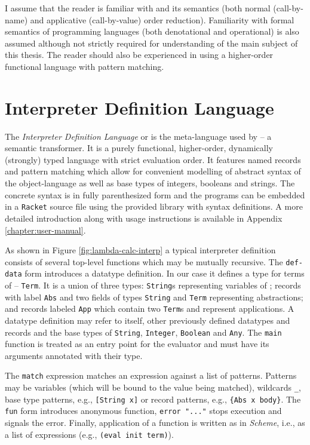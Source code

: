 I assume that the reader is familiar with \LC{} and its semantics (both normal (call-by-name) and applicative (call-by-value) order reduction).
Familiarity with formal semantics of programming languages (both denotational and operational) is also assumed although not strictly required for understanding of the main subject of this thesis.
The reader should also be experienced in using a higher-order functional language with pattern matching.

\section{Interpreter Definition Language}\label{sec:idl}
The \emph{Interpreter Definition Language} or \IDL{} is the meta-language used by \semt{} -- a semantic transformer.
It is a purely functional, higher-order, dynamically (strongly) typed language with strict evaluation order.
It features named records and pattern matching which allow for convenient modelling of abstract syntax of the object-language as well as base types of integers, booleans and strings.
The concrete syntax is in fully parenthesized form and the programs can be embedded in a \texttt{Racket} source file using the provided library with syntax definitions.
A more detailed introduction along with usage instructions is available in 
Appendix \ref{chapter:user-manual}.

As shown in Figure \ref{fig:lambda-calc-interp} a typical interpreter definition consists of several top-level functions which may be mutually recursive.
The \lstinline!def-data! form introduces a datatype definition.
In our case it defines a type for terms of \LC{} -- \lstinline!Term!.
It is a union of three types: \lstinline!String!s representing variables of \LC{}; records with label \lstinline!Abs! and two fields of types \lstinline!String! and \lstinline!Term! representing abstractions; and records labeled \lstinline!App! which contain two \lstinline!Term!s and represent applications.
A datatype definition may refer to itself, other previously defined datatypes and records and the base types of \lstinline!String!, \lstinline!Integer!, \lstinline!Boolean! and \lstinline!Any!.
The \texttt{main} function is treated as an entry point for the evaluator and must have its arguments annotated with their type.

The \lstinline!match! expression matches an expression against a list of patterns.
Patterns may be variables (which will be bound to the value being matched), wildcards \lstinline!_!, base type patterns, e.g., \lstinline![String x]! or record patterns, e.g., \lstinline!{Abs x body}!.
The \lstinline!fun! form introduces anonymous function, \lstinline!error "..."! stops execution and signals the error.
Finally, application of a function is written as in \textit{Scheme}, i.e., as a list of expressions (e.g., \lstinline!(eval init term)!).

